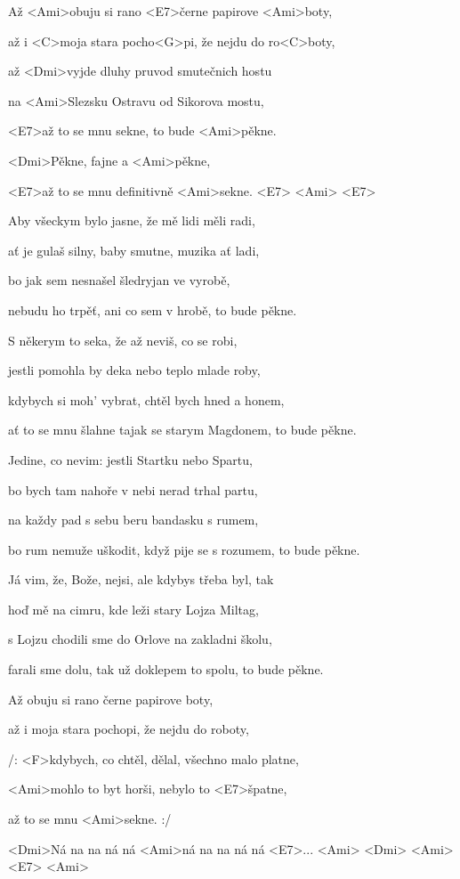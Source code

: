 


\zs
Až <Ami>obuju si rano <E7>černe papirove <Ami>boty,

až i <C>moja stara pocho<G>pi, že nejdu do ro<C>boty,

až <Dmi>vyjde dluhy pruvod smutečnich hostu

na <Ami>Slezsku Ostravu od Sikorova mostu,

<E7>až to se mnu sekne, to bude <Ami>pěkne.
\ks

\zr
<Dmi>Pěkne, fajne a <Ami>pěkne,

<E7>až to se mnu definitivně <Ami>sekne. <E7> <Ami> <E7>
\kr

\zs
Aby všeckym bylo jasne, že mě lidi měli radi,

ať je gulaš silny, baby smutne, muzika ať ladi,

bo jak sem nesnašel šledryjan ve vyrobě,

nebudu ho trpěť, ani co sem v hrobě, to bude pěkne.
\ks

\zr\kr

\zs
S někerym to seka, že až neviš, co se robi,

jestli pomohla by deka nebo teplo mlade roby,

kdybych si moh' vybrat, chtěl bych hned a honem,

ať to se mnu šlahne tajak se starym Magdonem, to bude pěkne.
\ks

\zr\kr

\zs
Jedine, co nevim: jestli Startku nebo Spartu,

bo bych tam nahoře v nebi nerad trhal partu,

na každy pad s sebu beru bandasku s rumem,

bo rum nemuže uškodit, když pije se s rozumem, to bude pěkne.
\ks

\zr\kr
\goodbreak

\zs
Já vim, že, Bože, nejsi, ale kdybys třeba byl, tak

hoď mě na cimru, kde leži stary Lojza Miltag,

s Lojzu chodili sme do Orlove na zakladni školu,

farali sme dolu, tak už doklepem to spolu, to bude pěkne.
\ks

\zr\kr

\zs
Až obuju si rano černe papirove boty,

až i moja stara pochopi, že nejdu do roboty,

/: <F>kdybych, co chtěl, dělal, všechno malo platne,

<Ami>mohlo to byt horši, nebylo to <E7>špatne,

až to se mnu <Ami>sekne. :/
\ks

<Dmi>Ná na na ná ná <Ami>ná na na ná ná <E7>...
<Ami> <Dmi> <Ami> <E7> <Ami>

\kp
